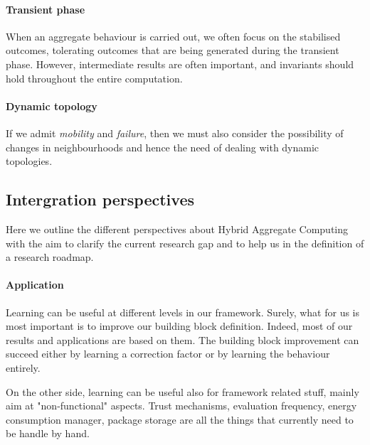 \documentclass[
  twocolumn,
]{ceurart}
\begin{document}
\paragraph{Transient phase}
%
When an aggregate behaviour is carried out,
 we often focus on the stabilised outcomes,
 tolerating outcomes that are being generated
 during the transient phase.
%
However, intermediate results are often important,
 and invariants should hold throughout the entire computation.

\paragraph{Dynamic topology}
%
If we admit \emph{mobility} and \emph{failure},
 then we must also consider 
 the possibility of changes in neighbourhoods
 and hence the need of dealing with dynamic topologies.


\subsection{Intergration perspectives}
Here we outline the different perspectives about Hybrid Aggregate Computing with the aim
 to clarify the current research gap and to help us in the definition of a research roadmap.
%
\paragraph{Application} Learning can be useful at different levels in our framework.
 Surely, what for us is most important is to improve our building block definition.
%
 Indeed, most of our results and applications are based on them.
 The building block improvement can succeed either by learning a correction factor or by learning the behaviour entirely.

On the other side, learning can be useful also for framework related stuff,
 mainly aim at "non-functional" aspects. Trust mechanisms, evaluation frequency,
 energy consumption manager, package storage are all the things that currently need to be handle by hand.
 
\end{document}
